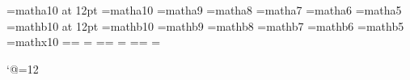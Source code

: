 %
\def\@xDeclareMathDelimiter#1#2#3#4#5{%
	\count255=\csname#2fam\endcsname
	\multiply\count255 by 256\advance\count255 by #3
	\multiply\count255 by 16
	\advance\count255 by \csname#4fam\endcsname
	\multiply\count255 by 256\advance\count255 by #5
	\expandafter\delcode\expandafter`\csname#1\endcsname=\count255
	\symbol@mark{#1}{8}}%
%
\def\DeclareMathDelimiter#1{\check@definition{#1}%
	\ifcat\noexpand#1\relax
	\def\Large@stuff{\noexpand\delimiter}%
	\expandafter\@DeclareMathDelimiter
	\else\expandafter\@xDeclareMathDelimiter\fi#1}%
%
\def\DeclareMathRadical#1#2#3#4#5{%
	\edef#1{\noexpand\radical\noexpand"%
	\expandafter\hexnumber@\csname#2fam\endcsname\gobble@quotes#3%
	\expandafter\hexnumber@\csname#4fam\endcsname\gobble@quotes#5 }%
	\symbol@mark{#1{}}{8}}%
%
\def\DeclareMathAccent#1#2#3#4{%
        \edef#1{\noexpand\mathaccent\noexpand"%
	\expandafter\hexnumber@\csname#3fam\endcsname\gobble@quotes#4 }%
	\symbol@mark{#1{}}{8}}%
%
%
\font\twelvematha=matha10 at 12pt
\font\tenmatha=matha10  \font\ninematha=matha9
\font\eightmatha=matha8 \font\sevenmatha=matha7
\font\sixmatha=matha6   \font\fivematha=matha5
\newfam\mathafam
\font\twelvemathb=mathb10 at 12pt
\font\tenmathb=mathb10  \font\ninemathb=mathb9
\font\eightmathb=mathb8 \font\sevenmathb=mathb7
\font\sixmathb=mathb6   \font\fivemathb=mathb5
\newfam\mathbfam
\font\tenmathx=mathx10
\newfam\mathxfam
%
%
\textfont\mathafam=\tenmatha  \scriptfont\mathafam=\sevenmatha
\scriptscriptfont\mathafam=\fivematha
\textfont\mathbfam=\tenmathb  \scriptfont\mathbfam=\sevenmathb
\scriptscriptfont\mathbfam=\fivemathb
\textfont\mathxfam=\tenmathx  \scriptfont\mathxfam=\tenmathx
\scriptscriptfont\mathxfam=\tenmathx
\def\mathafont{\fam\mathafam\tenmatha}%
\def\mathbfont{\fam\mathbfam\tenmathb}%
\let\mathabx@matha=\relax
\let\mathabx@mathb=\relax
\let\mathabx@mathx=\relax
\let\end@mathabx=\relax

\catcode`@=12
\let\proofmode=\undefined
\endinput


